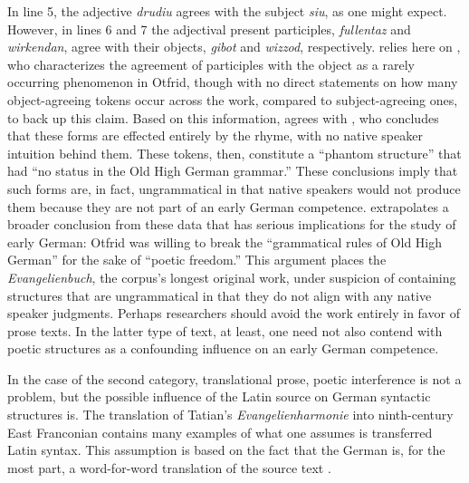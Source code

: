 \noindent In line 5, the adjective \textit{drudiu} agrees with the subject \textit{siu}, as one might expect. However, in lines 6 and 7 the adjectival present participles, \textit{fullentaz} and \textit{wirkendan}, agree with their objects, \textit{gibot} and \textit{wizzod}, respectively. \citet{Fleischer2006} relies here on \citet[216]{Erdmann1874}, who characterizes the agreement of participles with the object as a rarely occurring phenomenon in Otfrid, though with no direct statements on how many object-agreeing tokens occur across the work, compared to subject-agreeing ones, to back up this claim. Based on this information, \citet[37]{Fleischer2006} agrees with \citet[421]{Nemitz1962}, who concludes that these forms are effected entirely by the rhyme, with no native speaker intuition behind them. These tokens, then, constitute a “phantom structure” that had “no status in the Old High German grammar.” These conclusions imply that such forms are, in fact, ungrammatical in that native speakers would not produce them because they are not part of an early German competence. \citet[36]{Fleischer2006} extrapolates a broader conclusion from these data that has serious implications for the study of early German: Otfrid was willing to break the “grammatical rules of Old High German” for the sake of “poetic freedom.” This argument places the \textit{Evangelienbuch}, the corpus’s longest original work, under suspicion of containing structures that are ungrammatical in that they do not align with any native speaker judgments. Perhaps researchers should avoid the work entirely in favor of prose texts. In the latter type of text, at least, one need not also contend with poetic structures as a confounding influence on an early German competence.

In the case of the second category, translational prose, poetic interference is not a problem, but the possible influence of the Latin source on German syntactic structures is. The translation of Tatian’s \textit{Evangelienharmonie} into ninth-century East Franconian contains many examples of what one assumes is transferred Latin syntax. This assumption is based on the fact that the German is, for the most part, a word-for-word translation of the source text .

